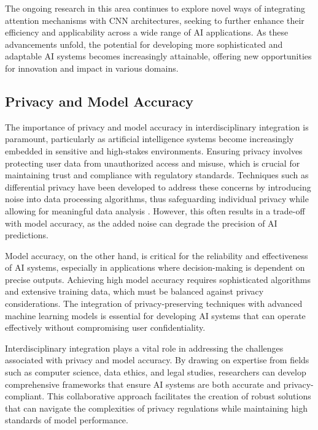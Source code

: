 The ongoing research in this area continues to explore novel ways of integrating attention mechanisms with CNN architectures, seeking to further enhance their efficiency and applicability across a wide range of AI applications. As these advancements unfold, the potential for developing more sophisticated and adaptable AI systems becomes increasingly attainable, offering new opportunities for innovation and impact in various domains.



\subsection{Privacy and Model Accuracy} \label{subsec:Privacy and Model Accuracy}

The importance of privacy and model accuracy in interdisciplinary integration is paramount, particularly as artificial intelligence systems become increasingly embedded in sensitive and high-stakes environments. Ensuring privacy involves protecting user data from unauthorized access and misuse, which is crucial for maintaining trust and compliance with regulatory standards. Techniques such as differential privacy have been developed to address these concerns by introducing noise into data processing algorithms, thus safeguarding individual privacy while allowing for meaningful data analysis \cite{kasneci2023chatgpt}. However, this often results in a trade-off with model accuracy, as the added noise can degrade the precision of AI predictions.



Model accuracy, on the other hand, is critical for the reliability and effectiveness of AI systems, especially in applications where decision-making is dependent on precise outputs. Achieving high model accuracy requires sophisticated algorithms and extensive training data, which must be balanced against privacy considerations. The integration of privacy-preserving techniques with advanced machine learning models is essential for developing AI systems that can operate effectively without compromising user confidentiality.



Interdisciplinary integration plays a vital role in addressing the challenges associated with privacy and model accuracy. By drawing on expertise from fields such as computer science, data ethics, and legal studies, researchers can develop comprehensive frameworks that ensure AI systems are both accurate and privacy-compliant. This collaborative approach facilitates the creation of robust solutions that can navigate the complexities of privacy regulations while maintaining high standards of model performance.














